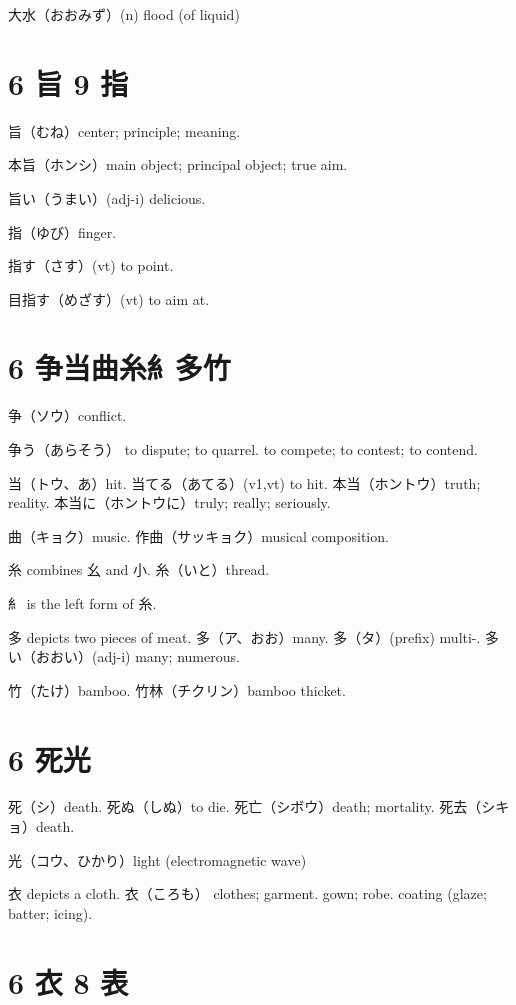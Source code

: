 大水（おおみず）(n) flood (of liquid)

\section{6 旨 9 指}

旨（むね）center; principle; meaning.

本旨（ホンシ）main object; principal object; true aim.

旨い（うまい）(adj-i) delicious.

指（ゆび）finger.

指す（さす）(vt) to point.

目指す（めざす）(vt) to aim at.

\section{6 争当曲糸糹多竹}

争（ソウ）conflict.

争う（あらそう）
to dispute; to quarrel.
to compete; to contest; to contend.

当（トウ、あ）hit.
当てる（あてる）(v1,vt) to hit.
本当（ホントウ）truth; reality.
本当に（ホントウに）truly; really; seriously.

曲（キョク）music.
作曲（サッキョク）musical composition.

糸 combines 幺 and 小.
糸（いと）thread.

糹 is the left form of 糸.

多 depicts two pieces of meat.
多（ア、おお）many.
多（タ）(prefix) multi-.
多い（おおい）(adj-i) many; numerous.

竹（たけ）bamboo.
竹林（チクリン）bamboo thicket.

\section{6 死光}

死（シ）death.
死ぬ（しぬ）to die.
死亡（シボウ）death; mortality.
死去（シキョ）death.

光（コウ、ひかり）light (electromagnetic wave)

衣 depicts a cloth.
衣（ころも）
clothes;
garment. gown;
robe. coating (glaze; batter; icing).

\section{6 衣 8 表}

